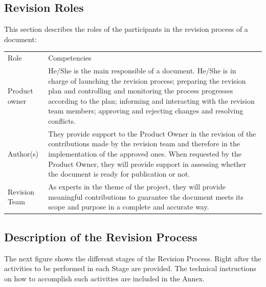 \documentclass{template/openetcs_article}
\begin{document}
\subsection{Revision Roles}

This section describes the roles of the participants in the revision process of a document:

\begin{flushleft}
\begin{tabular}{|m{3cm}|m{11cm}|}
\hline
\rowcolor{myblue}
\multicolumn{2}{|c|}{Roles} \\\hline
\rowcolor{lightgray}
Role &
Competencies 
\\\hline
Product owner &
He/She is the main responsible of a document. 
He/She is in charge of launching the revision process; preparing the revision plan and controlling and monitoring the process progresses according to the plan; informing and interacting with the revision team members; approving and rejecting changes and resolving conflicts.
\\\hline
Author(s) & 
They provide support to the Product Owner in the revision of the contributions made by the revision team and therefore in the implementation of the approved ones. When requested by the Product Owner, they will provide support in assessing whether the document is ready for publication or not.
\\\hline
Revision Team &
As experts in the theme of the project, they will provide meaningful contributions to guarantee the document meets its scope and purpose  in a complete and accurate way.
\\\hline
\end{tabular}
\end{flushleft}

\subsection{Description of the Revision Process}

The next figure shows the different stages of the Revision Process. Right after the activities to be performed in each Stage are provided. The technical instructions on how to accomplish such activities are included in the Annex.
\end{document}
